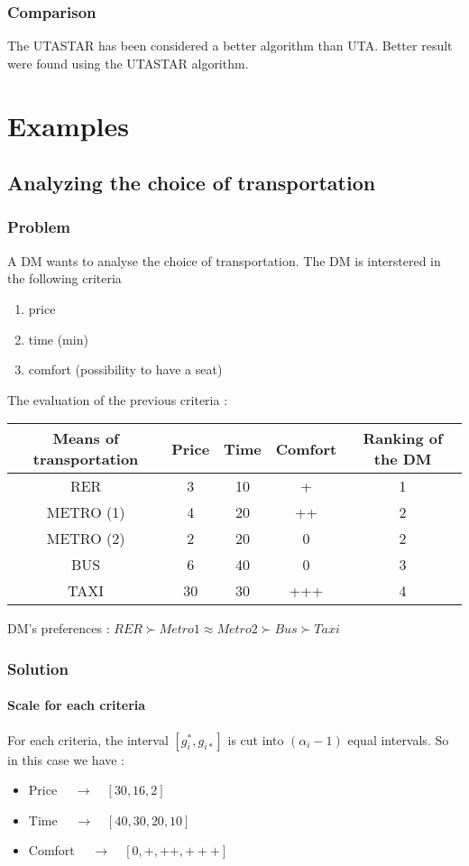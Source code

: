 \documentclass{report}
\begin{document}
\subsection{Comparison}
The UTASTAR has been considered a better algorithm than UTA. Better result were found using the UTASTAR algorithm.

\chapter{Examples}

\section{ Analyzing the choice of transportation}
\subsection{Problem}
A DM wants to analyse the choice of transportation. The DM is interstered in the following criteria 
\begin{enumerate}
\item price
\item time (min)
\item comfort (possibility to have a seat)
\end{enumerate}\leavevmode

The evaluation of the previous criteria :
\begin{center}
\begin{tabular}{ |c|c|c|c|c| } 
\hline
Means of transportation & Price & Time & Comfort & Ranking of the DM \\
\hline
RER & 3 & 10 & + & 1 \\
METRO (1) & 4 & 20 & ++ & 2 \\
METRO (2) & 2 & 20 & 0 & 2 \\
BUS & 6 & 40 & 0 & 3 \\
TAXI & 30 & 30 & +++ & 4 \\
\hline
\end{tabular}
\end{center}

DM's preferences : $ RER \succ  Metro1 \approx Metro2  \succ  Bus \succ  Taxi$\\
\newpage
\subsection{Solution}
\subsubsection{Scale for each criteria}
For each criteria, the interval $[g_i^{*}, g_{i*}]$ is cut into $(\alpha _i -1)$ equal intervals. So in this case we have : 
\begin{itemize}
\item Price  $\quad \rightarrow \quad [30, 16, 2]$
\item Time  $\quad \rightarrow \quad [40, 30, 20, 10]$
\item Comfort  $\quad \rightarrow \quad [0, +, ++, +++]$
\end{itemize}
\end{document}
